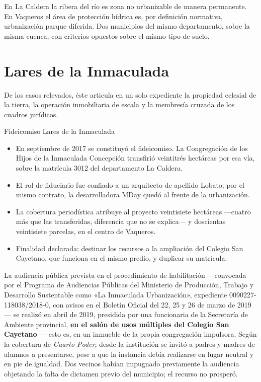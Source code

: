 En La Caldera la ribera del río es zona no urbanizable de manera permanente. En Vaqueros el área de protección hídrica es, por definición normativa, urbanización parque diferida. Dos municipios del mismo departamento, sobre la misma cuenca, con criterios opuestos sobre el mismo tipo de suelo.

\section{Lares de la Inmaculada}

De los casos relevados, éste articula en un solo expediente la propiedad eclesial de la tierra, la operación inmobiliaria de escala y la membresía cruzada de los cuadros jurídicos.

\begin{ficha}{Fideicomiso Lares de la Inmaculada}
\begin{itemize}[leftmargin=*,nosep]
\item En septiembre de 2017 se constituyó el fideicomiso. La Congregación de los Hijos de la Inmaculada Concepción transfirió veintitrés hectáreas por esa vía, sobre la matrícula 3012 del departamento La Caldera.
\item El rol de fiduciario fue confiado a un arquitecto de apellido Lobato; por el mismo contrato, la desarrolladora MDay quedó al frente de la urbanización.
\item La cobertura periodística atribuye al proyecto veintisiete hectáreas ---cuatro más que las transferidas, diferencia que no se explica--- y doscientas veintisiete parcelas, en el centro de Vaqueros.
\item Finalidad declarada: destinar los recursos a la ampliación del Colegio San Cayetano, que funciona en el mismo predio, y duplicar su matrícula.
\end{itemize}
\end{ficha}

La audiencia pública prevista en el procedimiento de habilitación ---convocada por el Programa de Audiencias Públicas del Ministerio de Producción, Trabajo y Desarrollo Sustentable como «La Inmaculada Urbanización», expediente 0090227-118038/2018-0, con avisos en el Boletín Oficial del 22, 25 y 26 de marzo de 2019--- se realizó en abril de 2019, presidida por una funcionaria de la Secretaría de Ambiente provincial, \textbf{en el salón de usos múltiples del Colegio San Cayetano} --- esto es, en un inmueble de la propia congregación impulsora. Según la cobertura de \textit{Cuarto Poder}, desde la institución se invitó a padres y madres de alumnos a presentarse, pese a que la instancia debía realizarse en lugar neutral y en pie de igualdad. Dos vecinos habían impugnado previamente la audiencia objetando la falta de dictamen previo del municipio; el recurso no prosperó.

